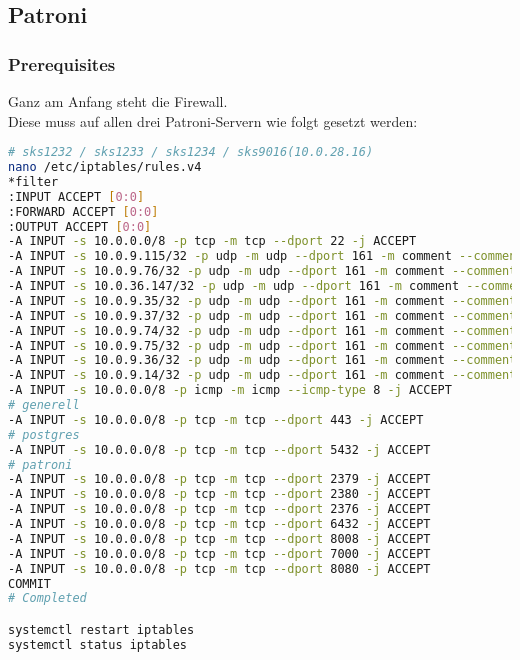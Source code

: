 
\begin{flushleft}
    \subsection{Patroni}
    \label{subsec:evaluation_installation_patroni}
    \subsubsection{Prerequisites}
    Ganz am Anfang steht die Firewall.\\
    Diese muss auf allen drei Patroni-Servern wie folgt gesetzt werden:
\lstset{style=gra_codestyle}
\begin{lstlisting}[language=bash, caption=Patroni - Firewall Settings,captionpos=b,label={lst:patroni-firewall-settings},breaklines=true]
# sks1232 / sks1233 / sks1234 / sks9016(10.0.28.16)
nano /etc/iptables/rules.v4
*filter
:INPUT ACCEPT [0:0]
:FORWARD ACCEPT [0:0]
:OUTPUT ACCEPT [0:0]
-A INPUT -s 10.0.0.0/8 -p tcp -m tcp --dport 22 -j ACCEPT
-A INPUT -s 10.0.9.115/32 -p udp -m udp --dport 161 -m comment --comment "Allow SNMP for probe 10.0.9.115" -j ACCEPT
-A INPUT -s 10.0.9.76/32 -p udp -m udp --dport 161 -m comment --comment "Allow SNMP for probe 10.0.9.76" -j ACCEPT
-A INPUT -s 10.0.36.147/32 -p udp -m udp --dport 161 -m comment --comment "Allow SNMP for probe 10.0.36.147" -j ACCEPT
-A INPUT -s 10.0.9.35/32 -p udp -m udp --dport 161 -m comment --comment "Allow SNMP for probe 10.0.9.35" -j ACCEPT
-A INPUT -s 10.0.9.37/32 -p udp -m udp --dport 161 -m comment --comment "Allow SNMP for probe 10.0.9.37" -j ACCEPT
-A INPUT -s 10.0.9.74/32 -p udp -m udp --dport 161 -m comment --comment "Allow SNMP for probe 10.0.9.74" -j ACCEPT
-A INPUT -s 10.0.9.75/32 -p udp -m udp --dport 161 -m comment --comment "Allow SNMP for probe 10.0.9.75" -j ACCEPT
-A INPUT -s 10.0.9.36/32 -p udp -m udp --dport 161 -m comment --comment "Allow SNMP for probe 10.0.9.36" -j ACCEPT
-A INPUT -s 10.0.9.14/32 -p udp -m udp --dport 161 -m comment --comment "Allow SNMP for probe 10.0.9.14" -j ACCEPT
-A INPUT -s 10.0.0.0/8 -p icmp -m icmp --icmp-type 8 -j ACCEPT
# generell
-A INPUT -s 10.0.0.0/8 -p tcp -m tcp --dport 443 -j ACCEPT
# postgres
-A INPUT -s 10.0.0.0/8 -p tcp -m tcp --dport 5432 -j ACCEPT
# patroni
-A INPUT -s 10.0.0.0/8 -p tcp -m tcp --dport 2379 -j ACCEPT
-A INPUT -s 10.0.0.0/8 -p tcp -m tcp --dport 2380 -j ACCEPT
-A INPUT -s 10.0.0.0/8 -p tcp -m tcp --dport 2376 -j ACCEPT
-A INPUT -s 10.0.0.0/8 -p tcp -m tcp --dport 6432 -j ACCEPT
-A INPUT -s 10.0.0.0/8 -p tcp -m tcp --dport 8008 -j ACCEPT
-A INPUT -s 10.0.0.0/8 -p tcp -m tcp --dport 7000 -j ACCEPT
-A INPUT -s 10.0.0.0/8 -p tcp -m tcp --dport 8080 -j ACCEPT
COMMIT
# Completed

systemctl restart iptables
systemctl status iptables
\end{lstlisting}

\end{flushleft}
